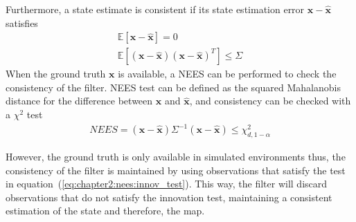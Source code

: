 Furthermore, a state estimate is consistent if its state estimation error $\bm{x} - \hat{\bm{x}}$ satisfies
\begin{align*}
    \mathbb{E}\left[\bm{x} - \hat{\bm{x}}\right] = 0\\
    \mathbb{E}\left[\left(\bm{x} - \hat{\bm{x}}\right)\left(\bm{x} - \hat{\bm{x}}\right)^T\right] \le \Sigma
\end{align*}
When the ground truth $\bm{x}$ is available, a \ac{NEES} can be performed to check the consistency of the filter. \ac{NEES} test can be defined as the squared Mahalanobis distance for the difference between $\bm{x}$ and $\hat{\bm{x}}$, and consistency can be checked with a $\chi^2$ test
\begin{align*}
    NEES = \left(\bm{x} - \hat{\bm{x}}\right) \Sigma^{-1} \left(\bm{x} - \hat{\bm{x}}\right) \le \chi_{d, 1-\alpha}^2
\end{align*}

However, the ground truth is only available in simulated environments thus, the consistency of the filter is maintained by using observations that satisfy the test in equation~(\ref{eq:chapter2:nees:innov_test}). This way, the filter will discard observations that do not satisfy the innovation test, maintaining a consistent estimation of the state and therefore, the map.
